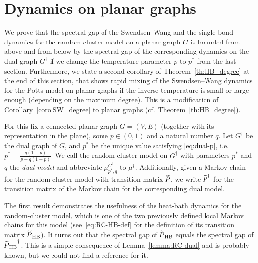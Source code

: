 \documentclass{dis}
\theoremstyle{citing}
\begin{document}
\vspace{2mm}

\section{Dynamics on planar graphs} \label{sec:5_result}

We prove that the spectral gap of the 
Swendsen--Wang and the single-bond dynamics for the random-cluster 
model on a planar graph $G$ is bounded from above and from below 
by the spectral gap of the corresponding dynamics on the 
dual graph $G^\dag$ 
if we change the temperature parameter $p$ to $p^*$ from the last 
section.
Furthermore, we state a second corollary of Theorem~\ref{th:HB_degree} 
at the end of this section, that shows rapid mixing of the Swendsen--Wang 
dynamics for the Potts model on planar graphs if the 
inverse temperature is small or large enough 
(depending on the maximum degree). 
This is a modification of Corollary~\ref{coro:SW_degree} to 
planar graphs (cf.~Theorem~\ref{th:HB_degree}). 

For this fix a connected planar graph $G=(V,E)$ 
(together with its representation in the plane), some $p\in(0,1)$ 
and a natural number $q$. 
Let $G^\dag$ be the dual graph of $G$, and 
$p^*$ be the unique value satisfying \eqref{eq:dual-p}, 
i.e. $p^*=\frac{q(1-p)}{p+q(1-p)}$. 
We call the random-cluster model on $G^\dag$ with parameters 
$p^*$ and $q$ the 
\emph{dual model} 
and abbreviate $\mu_{p^*,q}^{G^\dag}$ to $\mu^\dag$. 
Additionally, given a Markov chain for the random-cluster model 
with transition matrix ${\raisebox{2pt}{ ${\widetilde{{}}}$ }\mkern-14mu P}$, we write ${\raisebox{2pt}{ ${\widetilde{{}}}$ }\mkern-14mu P}^\dag$ for the transition 
matrix of the Markov chain for the corresponding 
dual model.

The first result demonstrates the usefulness of the heat-bath 
dynamics for the random-cluster model, 
which is one of the two previously defined local Markov chains 
for this model (see~\eqref{eq:RC-HB-def} for the definition 
of its transition matrix ${{\raisebox{2pt}{ ${\widetilde{{}}}$ }\mkern-14mu P}_{\rm HB}}$). 
It turns out that the spectral gap of ${{\raisebox{2pt}{ ${\widetilde{{}}}$ }\mkern-14mu P}_{\rm HB}}$ equals the 
spectral gap of ${{\raisebox{2pt}{ ${\widetilde{{}}}$ }\mkern-14mu P}_{\rm HB}}^\dag$. 
This is a simple consequence of Lemma~\ref{lemma:RC-dual} 
and is probably known, but we could not find a reference 
for it.

\vspace{3mm}
\end{document}
